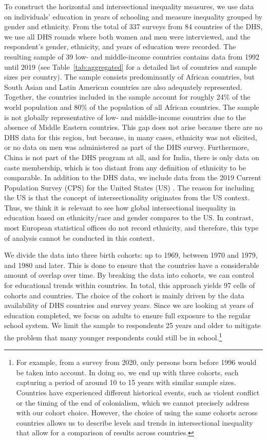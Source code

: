 To construct the horizontal and intersectional inequality measures, we use data on individuals' education in years of schooling and measure inequality grouped by gender and ethnicity. From the total of 337 surveys from 84 countries of the DHS, we use all DHS rounds where both women and men were interviewed, and the respondent's gender, ethnicity, and years of education were recorded. The resulting sample of 39 low- and middle-income countries contains data from 1992 until 2019 (see Table~\ref{tab:aggregated} for a detailed list of countries and sample sizes per country). The sample consists predominantly of African countries, but South Asian and Latin American countries are also adequately represented. Together, the countries included in the sample account for roughly 24\% of the world population and 80\% of the population of all African countries. The sample is not globally representative of low- and middle-income countries due to the absence of Middle Eastern countries. This gap does not arise because there are no DHS data for this region, but because, in many cases, ethnicity was not elicited, or no data on men was administered as part of the DHS survey. Furthermore, China is not part of the DHS program at all, and for India, there is only data on caste membership, which is too distant from any definition of ethnicity to be comparable. In addition to the DHS data, we include data from the 2019 Current Population Survey (CPS) for the United States (US) \citep{Flood2021}. The reason for including the US is that the concept of intersectionality originates from the US context. Thus, we think it is relevant to see how global intersectional inequality in education based on ethnicity/race and gender compares to the US. In contrast, most European statistical offices do not record ethnicity, and therefore, this type of analysis cannot be conducted in this context.

We divide the data into three birth cohorts: up to 1969, between 1970 and 1979, and 1980 and later. This is done to ensure that the countries have a considerable amount of overlap over time. By breaking the data into cohorts, we can control for educational trends within countries. In total, this approach yields 97 cells of cohorts and countries. The choice of the cohort is mainly driven by the data availability of DHS countries and survey years. Since we are looking at years of education completed, we focus on adults to ensure full exposure to the regular school system. We limit the sample to respondents 25 years and older to mitigate the problem that many younger respondents could still be in school.\footnote{For example, from a survey from 2020, only persons born before 1996 would be taken into account. In doing so, we end up with three cohorts, each capturing a period of around 10 to 15 years with similar sample sizes. Countries have experienced different historical events, such as violent conflict or the timing of the end of colonialism, which we cannot precisely address with our cohort choice. However, the choice of using the same cohorts across countries allows us to describe levels and trends in intersectional inequality that allow for a comparison of results across countries.}

